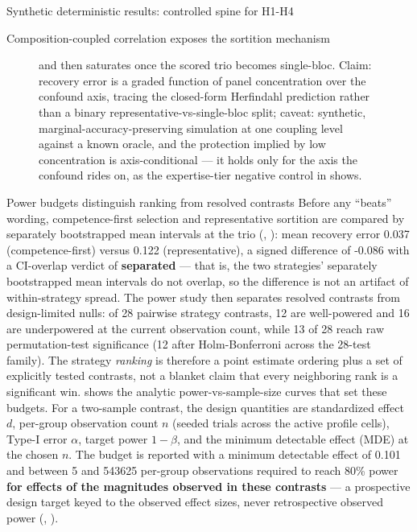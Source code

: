 \documentclass[
  ignorenonframetext,
]{beamer}
\begin{document}
\begin{frame}{Synthetic deterministic results:
controlled spine for H1-H4}
\begin{block}{Composition-coupled correlation exposes the sortition
mechanism}
\begin{figure}
{and then saturates once the scored trio becomes single-bloc. Claim:
recovery error is a graded function of panel concentration over the
confound axis, tracing the closed-form Herfindahl prediction rather than
a binary representative-vs-single-bloc split; caveat: synthetic,
marginal-accuracy-preserving simulation at one coupling level against a
known oracle, and the protection implied by low concentration is
axis-conditional --- it holds only for the axis the confound rides on,
as the expertise-tier negative control in 
shows.}\label{fig:dial}
\end{figure}
\end{block}

\begin{block}{Power budgets distinguish ranking from resolved contrasts}
\protect{}\label{power-budgets-distinguish-ranking-from-resolved-contrasts}
Before any ``beats'' wording, competence-first selection and
representative sortition are compared by separately bootstrapped mean
intervals at the trio (,
): mean recovery
error 0.037 (competence-first) versus 0.122 (representative), a signed
difference of -0.086 with a CI-overlap verdict of \textbf{separated} ---
that is, the two strategies' separately bootstrapped mean intervals do
not overlap, so the difference is not an artifact of within-strategy
spread. The power study then separates resolved contrasts from
design-limited nulls: of 28 pairwise strategy contrasts, 12 are
well-powered and 16 are underpowered at the current observation count,
while 13 of 28 reach raw permutation-test significance (12 after
Holm-Bonferroni across the 28-test family). The strategy \emph{ranking}
is therefore a point estimate ordering plus a set of explicitly tested
contrasts, not a blanket claim that every neighboring rank is a
significant win.  shows the analytic
power-vs-sample-size curves that set these budgets. For a two-sample
contrast, the design quantities are standardized effect \(d\), per-group
observation count \(n\) (seeded trials across the active profile cells),
Type-I error \(\alpha\), target power \(1-\beta\), and the minimum
detectable effect (MDE) at the chosen \(n\). The budget is reported with
a minimum detectable effect of 0.101 and between 5 and 543625 per-group
observations required to reach 80\% power \textbf{for effects of the
magnitudes observed in these contrasts} --- a prospective design target
keyed to the observed effect sizes, never retrospective observed power
(, ).


\end{block}
\end{frame}
\end{document}
